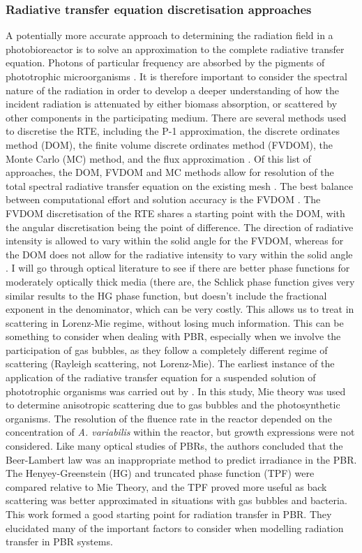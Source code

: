 \subsubsection{Radiative transfer equation discretisation approaches}
\label{S:2.3.2}
A potentially more accurate approach to determining the radiation field in a photobioreactor is to solve an approximation to the complete radiative transfer equation. Photons of particular frequency are absorbed by the pigments of phototrophic microorganisms \cite{McDermott1995}. It is therefore important to consider the spectral nature of the radiation in order to develop a deeper understanding of how the incident radiation is attenuated by either biomass absorption, or scattered by other components in the participating medium. There are several methods used to discretise the RTE, including the P-1 approximation, the discrete ordinates method (DOM), the finite volume discrete ordinates method (FVDOM), the Monte Carlo (MC) method, and the flux approximation \cite{Coelho2008}. Of this list of approaches, the DOM, FVDOM and MC methods allow for resolution of the total spectral radiative transfer equation on the existing mesh \cite{Kong2014}. The best balance between computational effort and solution accuracy is the FVDOM \cite{Modest2003,Kong2014} . The FVDOM discretisation of the RTE shares a starting point with the DOM, with the angular discretisation being the point of difference. The direction of radiative intensity is allowed to vary within the solid angle for the FVDOM, whereas for the DOM does not allow for the radiative intensity to vary within the solid angle \cite{Coelho2014}.
\skippingparagraph
I will go through optical literature to see if there are better phase functions for moderately optically thick media (there are, the Schlick phase function gives very similar results to the HG phase function, but doesn't include the fractional exponent in the denominator, which can be very costly. This allows us to treat in scattering in Lorenz-Mie regime, without losing much information. This can be something to consider when dealing with PBR, especially when we involve the participation of gas bubbles, as they follow a completely different regime of scattering (Rayleigh scattering, not Lorenz-Mie).
\skippingparagraph
The earliest instance of the application of the radiative transfer equation for a suspended solution of phototrophic organisms was carried out by \cite{Berberoglu2007}. In this study, Mie theory was used to determine anisotropic scattering due to gas bubbles and the photosynthetic organisms. The resolution of the fluence rate in the reactor depended on the concentration of \textit{A. variabilis} within the reactor, but growth expressions were not considered. Like many optical studies of PBRs, the authors concluded that the Beer-Lambert law was an inappropriate method to predict irradiance in the PBR. The Henyey-Greenstein (HG) and truncated phase function (TPF) were compared relative to Mie Theory, and the TPF proved more useful as back scattering was better approximated in situations with gas bubbles and bacteria. This work formed a good starting point for radiation transfer in PBR. They elucidated many of the important factors to consider when modelling radiation transfer in PBR systems. \skippingparagraph
